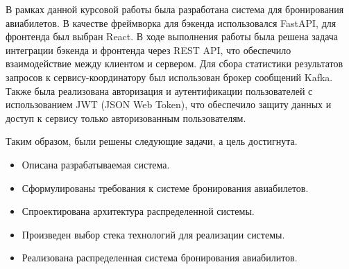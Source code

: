 \conclusion

В рамках данной курсовой работы была разработана система для бронирования авиабилетов. В качестве фреймворка для бэкенда использовался FastAPI, для фронтенда был выбран React. В ходе выполнения работы была решена задача интеграции бэкенда и фронтенда через REST API, что обеспечило взаимодействие между клиентом и сервером. Для сбора статистики результатов запросов к сервису-координатору был использован брокер сообщений Kafka. Также была реализована авторизация и аутентификации пользователей с использованием JWT (JSON Web Token), что обеспечило защиту данных и доступ к сервису только авторизованным пользователям.

Таким образом, были решены следующие задачи, а цель достигнута.
\begin{itemize}
  \item Описана разрабатываемая система.
  \item Сформулированы требования к системе бронирования авиабилетов.
  \item Спроектирована архитектура распределенной системы.
  \item Произведен выбор стека технологий для реализации системы.
  \item Реализована распределенная система бронирования авиабилитов.
\end{itemize}
